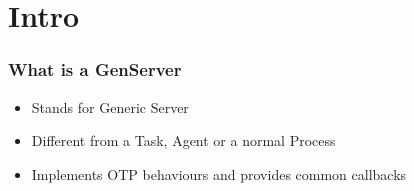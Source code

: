 \section{Intro}
\frame{\tableofcontents[currentsection]}

\begin{frame}
    \frametitle{What is a GenServer}
    \begin{itemize}
        \item Stands for Generic Server
        \item Different from a Task, Agent or a normal Process
        \item Implements OTP behaviours and provides common callbacks
    \end{itemize}
\end{frame}

